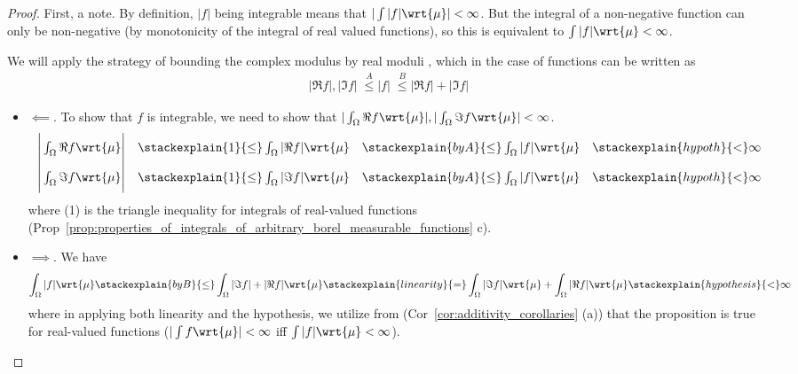 \documentclass{article} %
\newcommand{\dmu}{\wrt{\mu}}
\begin{document}
\begin{proof}
First, a note.  By definition, $|f|$ being integrable means that $|\int |f| \dmu| < \infty$. But the integral of a non-negative function can only be non-negative (by monotonicity of the integral of real valued functions), so this is equivalent to $\int |f| \dmu < \infty$.

We will apply the strategy of bounding the complex modulus by real moduli , which in the case of functions can be written as 
\begin{align}
|\Re f|, |\Im f| \; \stackrel{A}{\leq} |f| \; \stackrel{B}{\leq} |\Re f|+|\Im f|
\label{eqn:bounding_the_complex_modulus_by_real_moduli_for_functions} 
\end{align}


\begin{itemize}
\item $\boxed{\impliedby}$.  To show that $f$ is integrable, we need to show that $| \int_\Omega \Re f \dmu |, | \int_\Omega \Im f \dmu |  < \infty$.
\[
\begin{array}{rrrr}
\bigg| \int_\Omega \Re f \dmu \bigg| & \stackexplain{1}{\leq} \int_\Omega |\Re f| \dmu & \stackexplain{by A}{\leq} \int_\Omega |f| \dmu &\stackexplain{hypoth}{<} \infty  \\
\bigg| \int_\Omega \Im f \dmu \bigg| & \stackexplain{1}{\leq} \int_\Omega |\Im f| \dmu & \stackexplain{by A}{\leq} \int_\Omega |f| \dmu &\stackexplain{hypoth}{<} \infty  \\
\end{array}	
\]
where (1) is the triangle inequality for integrals of real-valued functions (Prop~\ref{prop:properties_of_integrals_of_arbitrary_borel_measurable_functions} c).  

\item $\boxed{\implies}$.  We have 
\[ \int_\Omega |f| \dmu \stackexplain{by B}{\leq} \int_\Omega |\Im f|  +  |\Re f| \dmu \stackexplain{linearity}{=}  \int_\Omega |\Im f| \dmu + \int_\Omega |\Re f| \dmu  \stackexplain{hypothesis}{<} \infty \]
where in applying both linearity and the hypothesis, we utilize from (Cor~\ref{cor:additivity_corollaries} (a)) that the proposition is true for real-valued functions ($|\int f \dmu | < \infty$ iff $\int |f| \dmu < \infty $).
\end{itemize}

\end{proof}


%

\end{document}
